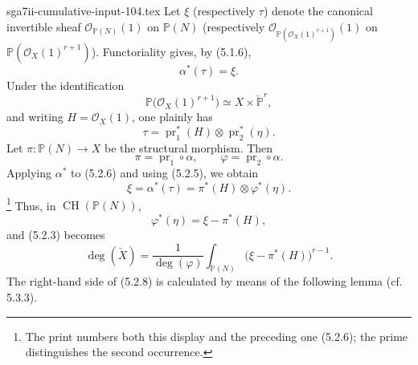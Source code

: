 \begin{filecontents*}{sga7ii-cumulative-input-104.tex}
Let $\xi$ (respectively $\tau$) denote the canonical invertible sheaf
$\mathcal O_{\mathbb P(N)}(1)$ on $\mathbb P(N)$ (respectively
$\mathcal O_{\mathbb P(\mathcal O_X(1)^{r+1})}(1)$ on
$\mathbb P(\mathcal O_X(1)^{r+1})$).  Functoriality gives, by
(5.1.6),
\begin{equation}\tag{5.2.5}
\alpha^*(\tau)=\xi.
\end{equation}
Under the identification
\[
\mathbb P\bigl(\mathcal O_X(1)^{r+1}\bigr)
\simeq X\times\check{\mathbb P}^{r},
\]
and writing $H=\mathcal O_X(1)$, one plainly has
\begin{equation}\tag{5.2.6}
\tau=\operatorname{pr}_1^*(H)\otimes\operatorname{pr}_2^*(\eta).
\end{equation}
Let $\pi:\mathbb P(N)\to X$ be the structural morphism.  Then
\[
\pi=\operatorname{pr}_1\circ\alpha,
\qquad
\varphi=\operatorname{pr}_2\circ\alpha.
\]
Applying $\alpha^*$ to (5.2.6) and using (5.2.5), we obtain
\begin{equation}\tag{5.2.6$'$}
\xi=\alpha^*(\tau)=\pi^*(H)\otimes\varphi^*(\eta).
\end{equation}
\footnote{The print numbers both this display and the preceding one
(5.2.6); the prime distinguishes the second occurrence.}
Thus, in $\operatorname{CH}(\mathbb P(N))$,
\begin{equation}\tag{5.2.7}
\varphi^*(\eta)=\xi-\pi^*(H),
\end{equation}
and (5.2.3) becomes
\begin{equation}\tag{5.2.8}
\deg(\check X)
=\frac{1}{\deg(\varphi)}
\int_{\mathbb P(N)}\bigl(\xi-\pi^*(H)\bigr)^{r-1}.
\end{equation}
The right-hand side of (5.2.8) is calculated by means of the
following lemma (cf. 5.3.3).
\end{filecontents*}
